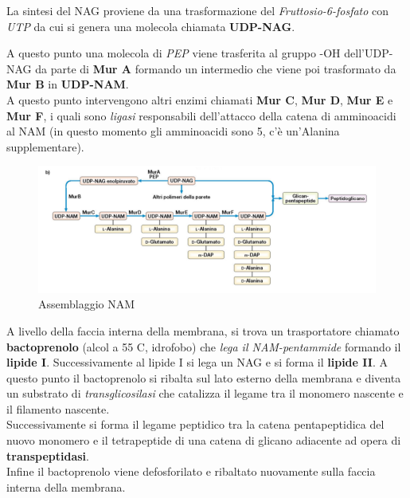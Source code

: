 \documentclass[11pt]{book}
\begin{document}
La sintesi del NAG proviene da una trasformazione del \emph{Fruttosio-6-fosfato} con \emph{UTP} da cui si genera una molecola chiamata \textbf{UDP-NAG}.

A questo punto una molecola di \emph{PEP} viene trasferita al gruppo -OH dell’UDP-NAG da parte di \textbf{Mur A} formando un intermedio che viene poi trasformato da \textbf{Mur B} in \textbf{UDP-NAM}. \\
A questo punto intervengono altri enzimi chiamati \textbf{Mur C}, \textbf{Mur D}, \textbf{Mur E} e \textbf{Mur F}, i quali sono \emph{ligasi} responsabili dell’attacco della catena di amminoacidi al NAM (in questo momento gli amminoacidi sono 5, c’è un’Alanina supplementare).

\begin{figure}[htp]
\centering
\includegraphics[scale=0.5]{img/Assemblaggio NAM.png}
\caption{Assemblaggio NAM}
\label{}
\end{figure}

A livello della faccia interna della membrana, si trova un trasportatore chiamato \textbf{bactoprenolo} (alcol a 55 C, idrofobo) che \emph{lega il NAM-pentammide} formando il \textbf{lipide I}. Successivamente al lipide I si lega un NAG e si forma il \textbf{lipide II}. A questo punto il bactoprenolo si ribalta sul lato esterno della membrana e diventa un substrato di \emph{transglicosilasi} che catalizza il legame tra il monomero nascente e il filamento nascente.\\
Successivamente si forma il legame peptidico tra la catena pentapeptidica del nuovo monomero e il tetrapeptide di una catena di glicano adiacente ad opera di \textbf{transpeptidasi}. \\
Infine il bactoprenolo viene defosforilato e ribaltato nuovamente sulla faccia interna della membrana.
\end{document}
